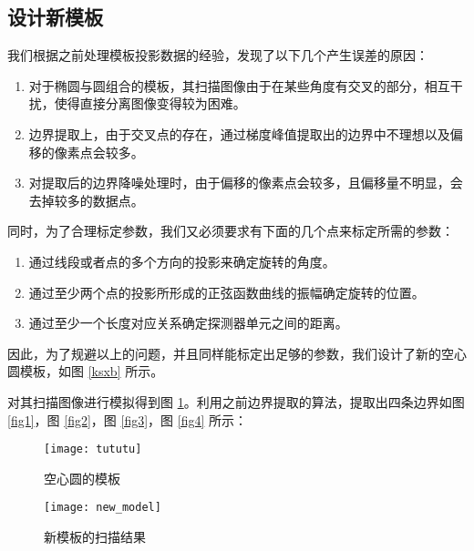 \documentclass[withoutpreface,bwprint]{cumcmthesis} %
\begin{document}
  \subsection{设计新模板}

    我们根据之前处理模板投影数据的经验，发现了以下几个产生误差的原因：
    \begin{enumerate}
      \item 对于椭圆与圆组合的模板，其扫描图像由于在某些角度有交叉的部分，相互干扰，使得直接分离图像变得较为困难。
      \item 边界提取上，由于交叉点的存在，通过梯度峰值提取出的边界中不理想以及偏移的像素点会较多。
      \item 对提取后的边界降噪处理时，由于偏移的像素点会较多，且偏移量不明显，会去掉较多的数据点。
    \end{enumerate}

    同时，为了合理标定参数，我们又必须要求有下面的几个点来标定所需的参数：
    \begin{enumerate}
      \item 通过线段或者点的多个方向的投影来确定旋转的角度。
      \item 通过至少两个点的投影所形成的正弦函数曲线的振幅确定旋转的位置。
      \item 通过至少一个长度对应关系确定探测器单元之间的距离。
    \end{enumerate}
    因此，为了规避以上的问题，并且同样能标定出足够的参数，我们设计了新的空心圆模板，如图 \ref{ksxb} 所示。

    对其扫描图像进行模拟得到图 \ref{xbscmn}。利用之前边界提取的算法，提取出四条边界如图 \ref{fig1}，图 \ref{fig2}，图 \ref{fig3}，图 \ref{fig4} 所示：

    \begin{figure}[!htbp]
      \begin{minipage}[t]{0.5\linewidth}
        \centering
        \texttt{[image: tututu]}
        \caption{空心圆的模板}
        \label{ksxb}
      \end{minipage}
      \begin{minipage}[t]{0.5\linewidth}
        \centering
        \texttt{[image: new\_model]}
        \caption{新模板的扫描结果}
        \label{xbscmn}
      \end{minipage}
    \end{figure}
\end{document}
